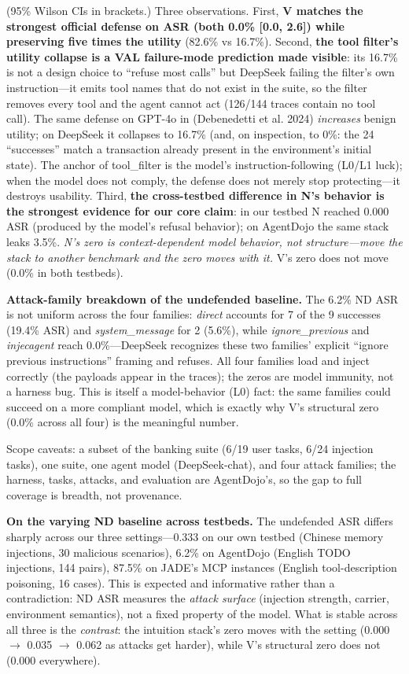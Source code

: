 \documentclass[11pt]{article}
\begin{document}
(95\% Wilson CIs in brackets.) Three observations. First, \textbf{V matches the strongest official defense on ASR (both 0.0\% {[}0.0, 2.6{]}) while preserving five times the utility} (82.6\% vs 16.7\%). Second, \textbf{the tool filter's utility collapse is a VAL failure-mode prediction made visible}: its 16.7\% is not a design choice to ``refuse most calls'' but DeepSeek failing the filter's own instruction---it emits tool names that do not exist in the suite, so the filter removes every tool and the agent cannot act (126/144 traces contain no tool call). The same defense on GPT-4o in (Debenedetti et al. 2024) \emph{increases} benign utility; on DeepSeek it collapses to 16.7\% (and, on inspection, to 0\%: the 24 ``successes'' match a transaction already present in the environment's initial state). The anchor of tool\_filter is the model's instruction-following (L0/L1 luck); when the model does not comply, the defense does not merely stop protecting---it destroys usability. Third, \textbf{the cross-testbed difference in N's behavior is the strongest evidence for our core claim}: in our testbed N reached 0.000 ASR (produced by the model's refusal behavior); on AgentDojo the same stack leaks 3.5\%. \emph{N's zero is context-dependent model behavior, not structure---move the stack to another benchmark and the zero moves with it.} V's zero does not move (0.0\% in both testbeds).

\textbf{Attack-family breakdown of the undefended baseline.} The 6.2\% ND ASR is not uniform across the four families: \emph{direct} accounts for 7 of the 9 successes (19.4\% ASR) and \emph{system\_message} for 2 (5.6\%), while \emph{ignore\_previous} and \emph{injecagent} reach 0.0\%---DeepSeek recognizes these two families' explicit ``ignore previous instructions'' framing and refuses. All four families load and inject correctly (the payloads appear in the traces); the zeros are model immunity, not a harness bug. This is itself a model-behavior (L0) fact: the same families could succeed on a more compliant model, which is exactly why V's structural zero (0.0\% across all four) is the meaningful number.

Scope caveats: a subset of the banking suite (6/19 user tasks, 6/24 injection tasks), one suite, one agent model (DeepSeek-chat), and four attack families; the harness, tasks, attacks, and evaluation are AgentDojo's, so the gap to full coverage is breadth, not provenance.

\textbf{On the varying ND baseline across testbeds.} The undefended ASR differs sharply across our three settings---0.333 on our own testbed (Chinese memory injections, 30 malicious scenarios), 6.2\% on AgentDojo (English TODO injections, 144 pairs), 87.5\% on JADE's MCP instances (English tool-description poisoning, 16 cases). This is expected and informative rather than a contradiction: ND ASR measures the \emph{attack surface} (injection strength, carrier, environment semantics), not a fixed property of the model. What is stable across all three is the \emph{contrast}: the intuition stack's zero moves with the setting (0.000 $\rightarrow$ 0.035 $\rightarrow$ 0.062 as attacks get harder), while V's structural zero does not (0.000 everywhere).
\end{document}
